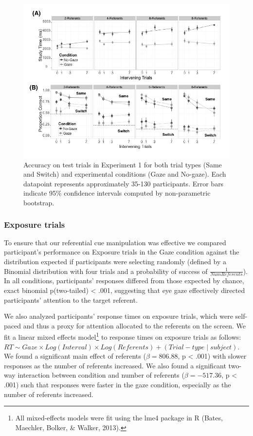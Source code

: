\documentclass[12pt,]{article}
\let\rmarkdownfootnote\footnote%
\def\footnote{\protect\rmarkdownfootnote}
\begin{document}
\begin{figure}[htbp]
\centering
\includegraphics{figs/expt1 plot-1.pdf}
\caption{Accuracy on test trials in Experiment 1 for both trial types
(Same and Switch) and experimental conditions (Gaze and No-gaze). Each
datapoint represents approximately 35-130 participants. Error bars
indicate 95\% confidence intervals computed by non-parametric
bootstrap.}
\end{figure}

\subsubsection{Exposure trials}\label{exposure-trials}

To ensure that our referential cue manipulation was effective we
compared participant's performance on Exposure trials in the Gaze
condition against the distribution expected if participants were
selecting randomly (defined by a Binomial distribution with four trials
and a probability of success of \(\frac{1}{Num Referents}\)). In all
conditions, participants' responses differed from those expected by
chance, exact binomial p(two-tailed) \textless{} .001, suggesting that
eye gaze effectively directed participants' attention to the target
referent.

We also analyzed participants' response times on exposure trials, which
were self-paced and thus a proxy for attention allocated to the
referents on the screen. We fit a linear mixed effects model\footnote{All
  mixed-effects models were fit using the lme4 package in R (Bates,
  Maechler, Bolker, \& Walker, 2013).} to response times on exposure
trials as follows:
\(RT \sim Gaze \times Log(Interval) \times Log(Referents) + (Trial-type \mid subject)\).
We found a significant main effect of referents (\(\beta = 806.88\), p
\textless{} .001) with slower responses as the number of referents
increased. We also found a significant two-way interaction between
condition and number of referents (\(\beta = -517.36\), p \textless{}
.001) such that responses were faster in the gaze condition, especially
as the number of referents increased.
\end{document}
